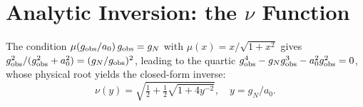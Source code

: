 \documentclass[aps,prd,twocolumn,showpacs,superscriptaddress]{revtex4-2}
\newcommand{\aO}{a_0}
\begin{document}
\section{Analytic Inversion: the $\nu$ Function}
\label{app:nu}

The condition $\mu(g_{\rm obs}/\aO)\,g_{\rm obs} = g_N$
with $\mu(x) = x/\sqrt{1+x^2}$ gives
$g_{\rm obs}^2/(g_{\rm obs}^2 + \aO^2) = (g_N/g_{\rm obs})^2$,
leading to the quartic $g_{\rm obs}^4 - g_N g_{\rm obs}^3 - \aO^2 g_{\rm obs}^2 = 0$,
whose physical root yields the closed-form inverse:
\begin{equation}
  \nu(y) = \sqrt{\tfrac{1}{2} + \tfrac{1}{2}\sqrt{1+4y^{-2}}},
  \quad y = g_N/\aO.
\end{equation}



\end{document}
